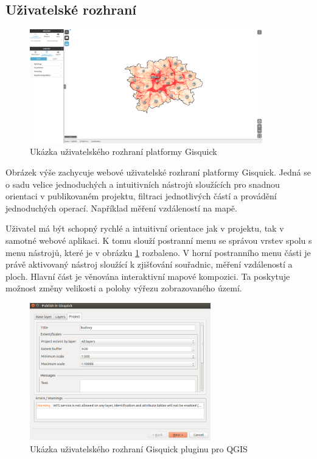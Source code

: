 \subsection{Uživatelské rozhraní}

\begin{figure}[h!]
\centering
\includegraphics[width=0.9\textwidth]{../img/gisquick_ui.png}
\caption{Ukázka uživatelského rozhraní platformy
Gisquick\cite{gisquick-prague}}
\label{fig:gisquick-prague}
\end{figure}

Obrázek výše zachycuje webové uživatelské rozhraní platformy
Gisquick. Jedná se o sadu velice jednoduchých a intuitivních nástrojů
sloužících pro snadnou orientaci v publikovaném projektu, filtraci
jednotlivých částí a provádění jednoduchých operací. Například
měření vzdáleností na mapě.

Uživatel má být schopný rychlé a intuitivní orientace jak v projektu,
tak v samotné webové aplikaci. K tomu slouží postranní menu se správou
vrstev spolu s menu nástrojů, které je v obrázku \ref{fig:gisquick-prague}
rozbaleno. V horní postranního menu části je právě aktivovaný
nástroj sloužící k zjišťování souřadnic, měření vzdáleností
a ploch. Hlavní část je věnována interaktivní mapové kompozici. Ta
poskytuje možnost změny velikosti a polohy výřezu zobrazovaného území.

\begin{figure}[h!]
\centering
\includegraphics[width=0.7\textwidth]{../img/gisquick_plugin.png}
\caption{Ukázka uživatelského rozhraní Gisquick pluginu pro QGIS}
\label{fig:gisquick-plugin}
\end{figure}

